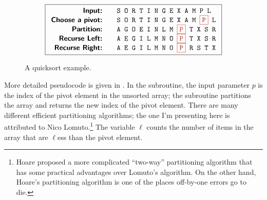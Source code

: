 \begin{figure}[ht]
\centering
\[
\fbox{$\begin{array}{r@{\qquad}l}
\mbox{\textsf{\textbf{Input:}}} & \mbox{\texttt{S O R T I N G E X A M P L}}\\
\mbox{\textsf{\textbf{Choose a pivot:}}} & \mbox{\texttt{S O R T I N G E X A M }{\color{JEred}\fbox{\texttt{P}}}\texttt{ L}}\\
\mbox{\textsf{\textbf{Partition:}}} & \mbox{\texttt{A G O E I N L M }{\color{JEred}\fbox{\texttt{P}}}\texttt{ T X S R}}\\
\mbox{\textsf{\textbf{Recurse Left:}}} & \mbox{\texttt{A E G I L M N O }{\color{JEred}\fbox{\texttt{P}}}\texttt{ T X S R}}\\
\mbox{\textsf{\textbf{Recurse Right:}}} & \mbox{\texttt{A E G I L M N O }{\color{JEred}\fbox{\texttt{P}}}\texttt{ R S T X}}
\end{array}$}
\]
\caption{A quicksort example.}
\label{fig:1.7}
\end{figure}
More detailed pseudocode is given in . In the  subroutine, the input parameter $p$ is the index of the pivot element in the unsorted array; the subroutine partitions the array and returns the new index of the pivot element. There are many different efficient partitioning algorithms; the one I’m presenting here is attributed to Nico Lomuto.\footnote{Hoare proposed a more complicated “two-way” partitioning algorithm that has some practical advantages over Lomuto’s algorithm. On the other hand, Hoare’s partitioning algorithm is one of the places off-by-one errors go to die.} The variable $\ell$ counts the number of items in the array that are $\ell$ess than the pivot element.

